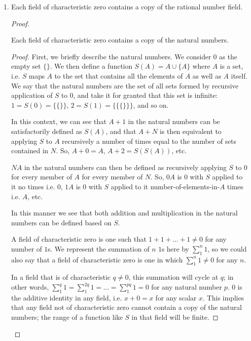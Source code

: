 \documentclass[12pt]{article}
\begin{document}
\begin{enumerate}
  \item
    \begin{thm}
      Each field of characteristic zero contains a copy of the
      rational number field.
      \begin{proof}
        \begin{lemma}
          Each field of characteristic zero contains a copy of
          the natural numbers.
          \begin{proof}
            First, we briefly describe the natural numbers. We
            consider $0$ as the empty set $\{\}$. We then define a
            function $S(A) = A \cup \{A\}$ where $A$ is a set, i.e.
            $S$ maps $A$ to the set that contains all the elements of
            $A$ as well as $A$ itself. We say that the natural
            numbers are the set of all sets formed by recursive
            application of $S$ to $0$, and take it for granted that
            this set is infinite: $1 = S(0) = \{\{\}\}$, $2 = S(1) =
            \{\{\{\}\}\}$, and so on.

            In this context, we can see that $A + 1$ in the natural
            numbers can be satisfactorily defined as $S(A)$, and that
            $A + N$ is then equivalent to applying $S$ to $A$
            recursively a number of times equal to the number of sets
            contained in $N$.  So, $A + 0 = A$, $A + 2 = S(S(A))$,
            etc.

            $NA$ in the natural numbers can then be defined as
            recursively applying $S$ to $0$ for every member of $A$
            for every member of $N$. So, $0A$ is $0$ with $S$ applied
            to it no times i.e. $0$, $1A$ is $0$ with $S$ applied to
            it number-of-elements-in-$A$ times i.e. $A$, etc.

            In this manner we see that both addition and
            multiplication in the natural numbers can be defined
            based on $S$.

            A field of characteristic zero is one such that $1 +
            1 + \ldots + 1 \neq 0$ for any number of $1$s. We
            represent the summation of $n$ $1$s here by
            $\sum_{1}^{n}1$, so we could also say that a field of
            characteristic zero is one in which $\sum_{1}^{n}1
            \neq 0$ for any $n$.

            In a field that is of characteristic $q \neq 0$, this
            summation will cycle at $q$; in other words,
            $\sum_{1}^{q}1 = \sum_{1}^{2q}1 = \ldots = \sum_{1}^{pq}1
            = 0$ for any natural number $p$. $0$ is the additive
            identity in any field, i.e. $x + 0 = x$ for any scalar
            $x$. This implies that any field not of characteristic
            zero cannot contain a copy of the natural numbers; the
            range of a function like $S$ in that field will be
            finite.


\end{proof}
\end{lemma}
\end{proof}
\end{thm}
\end{enumerate}
\end{document}
